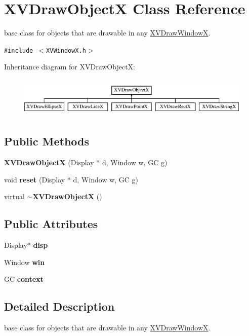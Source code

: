\hypertarget{class_XVDrawObjectX}{
\section{XVDraw\-Object\-X  Class Reference}
\label{XVDrawObjectX}
}
base class for objects that are drawable in any \hyperlink{class_XVDrawWindowX}{XVDraw\-Window\-X}. 


{\tt \#include $<$XVWindow\-X.h$>$}

Inheritance diagram for XVDraw\-Object\-X:\begin{figure}[H]
\begin{center}
\leavevmode
\includegraphics[height=1.96491cm]{class_XVDrawObjectX}
\end{center}
\end{figure}
\subsection*{Public Methods}
\begin{CompactItemize}
\item 
{\bf XVDraw\-Object\-X} (Display $\ast$ d, Window w, GC g)
\item 
void {\bf reset} (Display $\ast$ d, Window w, GC g)
\item 
virtual {\bf $\sim$XVDraw\-Object\-X} ()
\end{CompactItemize}
\subsection*{Public Attributes}
\begin{CompactItemize}
\item 
Display$\ast$ {\bf disp}
\item 
Window {\bf win}
\item 
GC {\bf context}
\end{CompactItemize}


\subsection{Detailed Description}
base class for objects that are drawable in any \hyperlink{class_XVDrawWindowX}{XVDraw\-Window\-X}.





